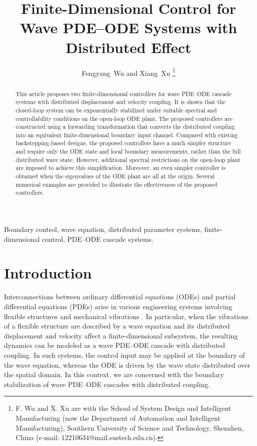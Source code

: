 \documentclass{IEEEtran}
\theoremstyle{definition}
\begin{document}
\title{Finite-Dimensional Control for Wave PDE--ODE Systems with Distributed Effect}

\author{Fengyang~Wu and Xiang~Xu
\thanks{F. Wu and X. Xu are with the School of System Design and Intelligent
Manufacturing (now the Department of Automation and Intelligent Manufacturing),
Southern University of Science and Technology, Shenzhen, China (e-mail:
12210634@mail.sustech.edu.cn).}}

\maketitle

\begin{abstract}
This article proposes two finite-dimensional controllers for wave PDE--ODE cascade systems with distributed displacement and velocity coupling. It is shown that the closed-loop system can be exponentially stabilized under suitable spectral and controllability conditions on the open-loop ODE plant. The proposed controllers are constructed using a forwarding transformation that converts the distributed coupling into an equivalent finite-dimensional boundary input channel. Compared with existing backstepping-based designs, the proposed controllers have a much simpler structure and require only the ODE state and local boundary measurements, rather than the full distributed wave state. However, additional spectral restrictions on the open-loop plant are imposed to achieve this simplification. Moreover, an even simpler controller is obtained when the eigenvalues of the ODE plant are all at the origin. Several numerical examples are provided to illustrate the effectiveness of the proposed controllers.

\end{abstract}

\begin{IEEEkeywords}
Boundary control, wave equation, distributed parameter systems, finite-dimensional control, PDE--ODE cascade systems.
\end{IEEEkeywords}



\section{Introduction}


Interconnections between ordinary differential equations (ODEs) and partial differential equations (PDEs) arise in various engineering systems involving flexible structures and mechanical vibrations \cite{krstic_compensating_2009,susto_control_2010,bekiaris-liberis_compensating_2010,artstein_linear-systems_1982}. In particular, when the vibrations of a flexible structure are described by a wave equation and its distributed displacement and velocity affect a finite-dimensional subsystem, the resulting dynamics can be modeled as a wave PDE--ODE cascade with distributed coupling. In such systems, the control input may be applied at the boundary of the wave equation, whereas the ODE is driven by the wave state distributed over the spatial domain. In this context, we are concerned with the boundary stabilization of wave PDE--ODE cascades with distributed coupling.
\end{document}
